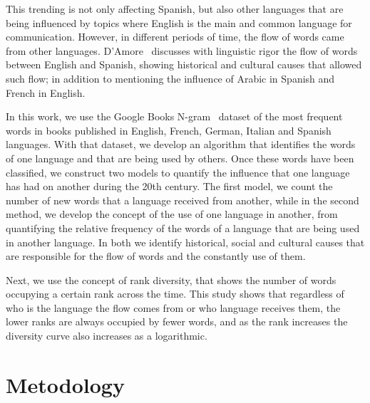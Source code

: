 \documentclass[10pt,letterpaper]{article} %
\begin{document}
This trending is not only affecting  Spanish,  but also other languages that are
being influenced by topics where English is the main and common language for
communication. However, in different periods of time, the flow of words came
from other languages. D’Amore~\cite{damore} discusses with linguistic rigor the
flow of words between English and Spanish,  showing historical  and cultural
causes that allowed such flow; in addition to mentioning the influence of
Arabic in Spanish and French in English. 
 
In this work, we use the Google Books N-gram~\cite{ngram} dataset of the most
frequent words in books published in  English, French, German, Italian and
Spanish languages.  With that dataset,  we develop an algorithm that identifies
the words of one language  and that are being used by others. Once these words
have been classified, we construct two models to quantify  the influence that
one language has had on another during the 20th century. The first model, we
count the number of new words that a language received from another, while in
the second method, we develop the concept of the use of one language in
another,  from quantifying the relative frequency of  the words of a language
that are being used in another language. In both we identify historical, social
and cultural causes that are responsible for the flow of words and the
constantly use of them.
 
Next, we use the concept of rank diversity,  that shows the number of words
occupying a certain rank across the time. This study shows that  regardless of
who is the language the flow comes from or who language receives them,  the
lower ranks are always occupied by fewer  words, and as the rank increases the
diversity curve also increases as a logarithmic. 
 

\section*{Metodology} %
\end{document}
